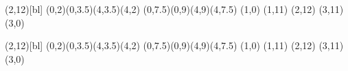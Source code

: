\savebox{\planche}(2,12)[bl]{%
  \color{gray}
  \polygon*(0,2)(0,3.5)(4,3.5)(4,2)
  \polygon*(0,7.5)(0,9)(4,9)(4,7.5)
  \color{lightgray}
  \moveto(1,0)
  \lineto(1,11)
  \lineto(2,12)
  \lineto(3,11)
  \lineto(3,0)
  \closepath
  \fillpath}

\savebox{\planchep}(2,12)[bl]{%
  \color{gray}
  \polygon*(0,2)(0,3.5)(4,3.5)(4,2)
  \polygon*(0,7.5)(0,9)(4,9)(4,7.5)
  \color[RGB]{204,76,57}
  \moveto(1,0)
  \lineto(1,11)
  \lineto(2,12)
  \lineto(3,11)
  \lineto(3,0)
  \closepath
  \fillpath}


